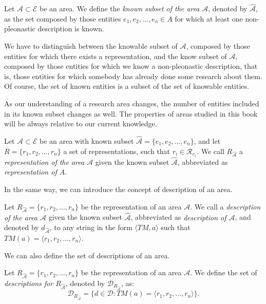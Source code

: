 \begin{definition}
Let $\mathcal{A} \subset \mathcal{E}$ be an area. We define the \emph{known subset of the area} $\mathcal{A}$, denoted by $\hat{\mathcal{A}}$, as the set composed by those entities $e_1, e_2, \ldots, e_n \in A$ for which at least one non-pleonastic description is known.
\end{definition}

We have to distinguish between the knowable subset of $\mathcal{A}$, composed by those entities for which there exists a representation, and the know subset of $\mathcal{A}$, composed by those entities for which we know a non-pleonastic description, that is, those entities for which somebody has already done some research about them. Of course, the set of known entities is a subset of the set of knowable entities.

As our understanding of a research area changes, the number of entities included in its known subset changes as well. The properties of areas studied in this book will be always relative to our current knowledge.

\begin{definition}
Let $\mathcal{A} \subset \mathcal{E}$ be an area with known subset $\hat{\mathcal{A}} = \{ e_1, e_2, \ldots, e_n \}$, and let  $R = \{ r_1, r_2, \ldots, r_n \}$ a set of representations, such that $r_i \in \mathcal{R}_{e_i}$. We call $R_{\hat{\mathcal{A}}}$ a \emph{representation of the area $\mathcal{A}$} given the known subset $\hat{\mathcal{A}}$, abbreviated as \emph{representation of $A$}.
\end{definition}

In the same way, we can introduce the concept of description of an area.

\begin{definition}
Let $R_{\hat{\mathcal{A}}} = \{ r_1, r_2, \ldots, r_n \}$ be the representation of an area $\mathcal{A}$. We call a \emph{description of the area $\mathcal{A}$} given the known subset $\hat{\mathcal{A}}$, abbreviated as \emph{description of $\mathcal{A}$}, and denoted by $d_{\hat{\mathcal{A}}}$, to any string in the form $\langle TM, a\rangle$ such that $TM(a) = \langle r_1, r_2, \ldots, r_n\rangle$.
\end{definition}

We can also define the set of descriptions of an area.

\begin{definition}
Let $R_{\hat{\mathcal{A}}} = \{ r_1, r_2, \ldots, r_n \}$ be the representation of an area $\mathcal{A}$. We define the set of \emph{descriptions for $R_{\hat{\mathcal{A}}}$}, denoted by $\mathcal{D}_{R_{\hat{\mathcal{A}}}}$, as:
\[
\mathcal{D}_{R_{\hat{\mathcal{A}}}} = \{ d \in \mathcal{D} : TM(a) = \langle r_1, r_2, \ldots, r_n\rangle \}.
\]
\end{definition}

